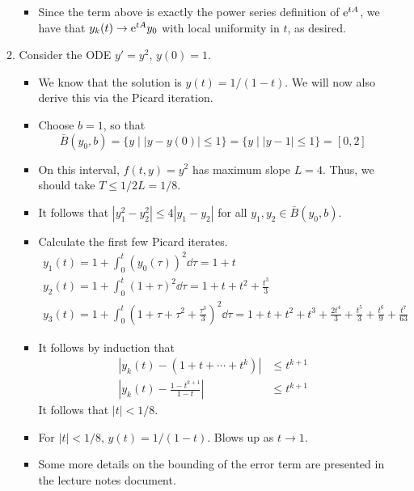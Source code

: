 \documentclass[../notes.tex]{subfiles}
\begin{document}
\begin{itemize}
\begin{enumerate}
\begin{itemize}
            \item Since the term above is exactly the power series definition of $\e[tA]$, we have that $y_k(t)\to\e[tA]y_0$ with local uniformity in $t$, as desired.
        \end{itemize}
        \item Consider the ODE $y'=y^2$, $y(0)=1$.
        \begin{itemize}
            \item We know that the solution is $y(t)=1/(1-t)$. We will now also derive this via the Picard iteration.
            \item Choose $b=1$, so that
            \begin{equation*}
                \bar{B}(y_0,b) = \{y\mid |y-y(0)|\leq 1\}
                = \{y\mid |y-1|\leq 1\}
                = [0,2]
            \end{equation*}
            \item On this interval, $f(t,y)=y^2$ has maximum slope $L=4$. Thus, we should take $T\leq 1/2L=1/8$.
            \item It follows that $|y_1^2-y_2^2|\leq 4|y_1-y_2|$ for all $y_1,y_2\in\bar{B}(y_0,b)$.
            \item Calculate the first few Picard iterates.
            \begin{gather*}
                y_1(t) = 1+\int_0^t(y_0(\tau))^2\dd\tau
                    = 1+t\\
                y_2(t) = 1+\int_0^t(1+\tau)^2\dd\tau
                    = 1+t+t^2+\frac{t^3}{3}\\
                y_3(t) = 1+\int_0^t\left( 1+\tau+\tau^2+\frac{\tau^3}{3} \right)^2\dd\tau
                    = 1+t+t^2+t^3+\frac{2t^4}{3}+\frac{t^5}{3}+\frac{t^6}{9}+\frac{t^7}{63}
            \end{gather*}
            \item It follows by induction that
            \begin{align*}
                |y_k(t)-(1+t+\cdots+t^k)| &\leq t^{k+1}\\
                \left| y_k(t)-\frac{1-t^{k+1}}{1-t} \right| &\leq t^{k+1}
            \end{align*}
            It follows that $|t|<1/8$.
            \item For $|t|<1/8$, $y(t)=1/(1-t)$. Blows up as $t\to 1$.
            \item Some more details on the bounding of the error term are presented in the lecture notes document.
        \end{itemize}

\end{enumerate}
\end{itemize}
\end{document}
